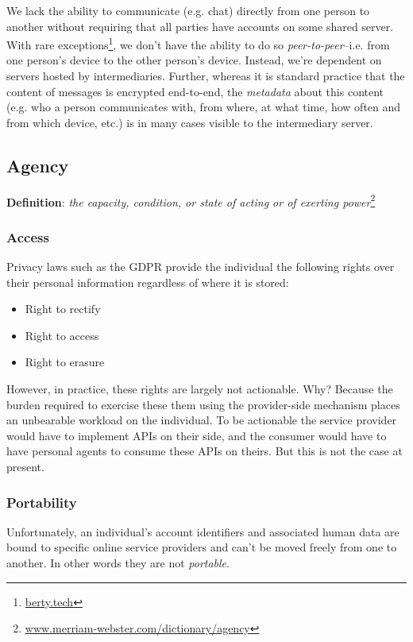 \documentclass[11pt, oneside]{article}   	%
\newcommand{\hyperfootnote}[1][]{\def\ArgI{{#1}}\hyperfootnoteRelay}
\newcommand\hyperfootnoteRelay[2][]{\href{#1#2}{\ArgI}\footnote{\href{#1#2}{#2}}}
\begin{document}
We lack the ability to communicate (e.g. chat) directly from one person to another without requiring that all parties have accounts on some shared server. With rare exceptions\hyperfootnote[][https://]{berty.tech}, we don't have the ability to do so \emph{peer-to-peer}--i.e. from one person's device to the other person's device. Instead, we're dependent on servers hosted by intermediaries. Further, whereas it is standard practice that the content of messages is encrypted end-to-end, the \emph{metadata} about this content (e.g. who a person communicates with, from where, at what time, how often and from which device, etc.) is in many cases visible to the intermediary server.

\subsection{Agency}

\textbf{Definition}: \emph{the capacity, condition, or state of acting or of exerting power}\hyperfootnote[][https://]{www.merriam-webster.com/dictionary/agency}

\subsubsection{Access}

Privacy laws such as the GDPR provide the individual the following rights over their personal information regardless of where it is stored:
\begin{itemize}
	\item Right to rectify
	\item Right to access
	\item Right to erasure
\end{itemize}

However, in practice, these rights are largely not actionable. Why? Because the burden required to exercise these them using the provider-side mechanism places an unbearable workload on the individual. To be actionable the service provider would have to implement APIs on their side, and the consumer would have to have personal agents to consume these APIs on theirs. But this is not the case at present.

\subsubsection{Portability}

Unfortunately, an individual's account identifiers and associated human data are bound to specific online service providers and can't be moved freely from one to another. In other words they are not \emph{portable}.
\end{document}
